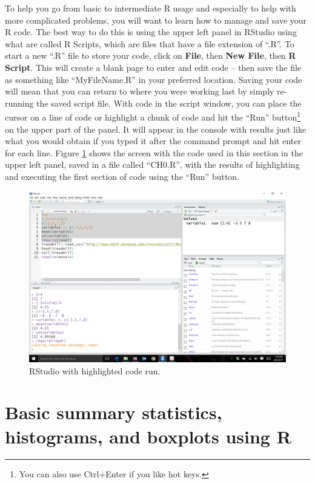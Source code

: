 \documentclass[]{book}
\let\rmarkdownfootnote\footnote%
\def\footnote{\protect\rmarkdownfootnote}
\renewcommand{\indent}{\hspace{15pt}}
\begin{document}
\indent To help you go from basic to intermediate R usage and especially to help with more
complicated problems, you will want to learn how to manage and save your R code.
The best way to do this is using the upper left panel in RStudio using what
are called R Scripts, which are files that have a file extension of ``.R''. To
start a new ``.R'' file to store your code, click on \textbf{File}, then
\textbf{New File}, then \textbf{R Script}. This will create a blank page to enter and
edit code -- then save the file as something like ``MyFileName.R'' in your preferred location.
Saving your code will mean that you can return to where you
were working last by simply re-running the saved script file. With code in the
script window, you can place the cursor on a line of code or highlight a chunk
of code and hit the ``Run'' button\footnote{You can also use Ctrl+Enter if you like hot keys.}
on the upper part of the panel. It will appear
in the console with results just like what you would obtain if you typed it
after the command prompt and hit enter for each line. Figure \ref{fig:Figure1-4}
shows the screen with the code used in this
section in the upper left panel, saved in
a file called ``CH0.R'', with the results of highlighting and executing the first
section of code using the ``Run'' button.



\begin{figure}[ht]
\includegraphics[width=38.01in]{chapter1_files/fig1.4} \caption{RStudio with highlighted code run.}\label{fig:Figure1-4}
\end{figure}

\hypertarget{section1-3}{%
\section{Basic summary statistics, histograms, and boxplots using R}\label{section1-3}}
\end{document}
